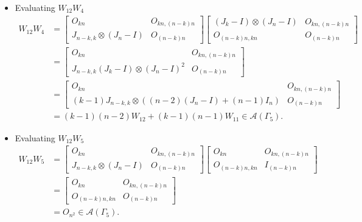 \begin{itemize}
\item Evaluating $W_{12}W_{4}$
\begin{align*}
    W_{12}W_{4}
    &= \begin{bmatrix}
        O_{kn} & O_{kn, (n-k)n} \\
        J_{n-k, k}\otimes (J_n-I) & O_{(n-k)n}
    \end{bmatrix}
    \begin{bmatrix}
        (J_k-I)\otimes(J_n-I) & O_{kn, (n-k)n} \\
        O_{(n-k)n,kn} & O_{(n-k)n}
    \end{bmatrix}\\
    &= \begin{bmatrix}
        O_{kn} & O_{kn, (n-k)n} \\
        J_{n-k, k}(J_k-I)\otimes (J_n-I)^2 & O_{(n-k)n}
    \end{bmatrix}\\
    &= \begin{bmatrix}
        O_{kn} & O_{kn, (n-k)n} \\
        (k-1)J_{n-k, k}\otimes ((n-2)(J_n-I) + (n-1)I_n) & O_{(n-k)n}
    \end{bmatrix}\\
    &= (k-1)(n-2)W_{12} + (k-1)(n-1)W_{11}\in\mathcal{A}(\Gamma_5).
\end{align*}

\item Evaluating $W_{12}W_{5}$
\begin{align*}
    W_{12}W_{5}
    &= \begin{bmatrix}
        O_{kn} & O_{kn, (n-k)n} \\
        J_{n-k, k}\otimes (J_n-I) & O_{(n-k)n}
    \end{bmatrix}
    \begin{bmatrix}
        O_{kn} & O_{kn, (n-k)n} \\
        O_{(n-k)n,kn} & I_{(n-k)n}
    \end{bmatrix}\\
    &= \begin{bmatrix}
        O_{kn} & O_{kn, (n-k)n} \\
        O_{(n-k)n,kn} & O_{(n - k)n}
    \end{bmatrix}\\
    &= O_{n^2} \in\mathcal{A}(\Gamma_5).
\end{align*}


\end{itemize}
